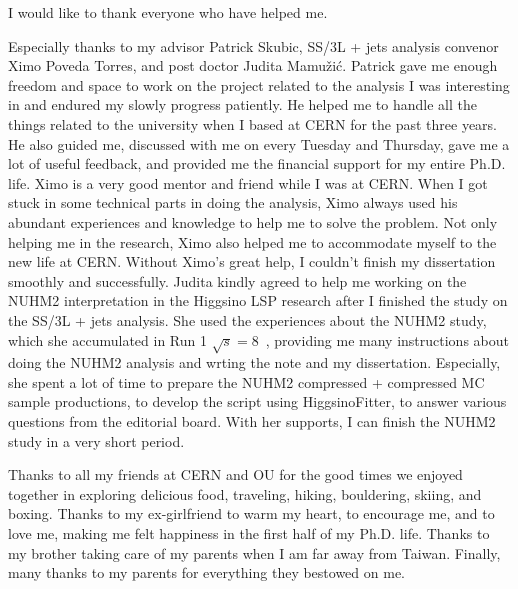 I would like to thank everyone who have helped me.

Especially thanks to my advisor Patrick Skubic, SS/3L + jets analysis convenor Ximo Poveda Torres, and post doctor Judita Mamu\v{z}i\'{c}.
%
Patrick gave me enough freedom and space to work on the project related to the analysis I was interesting in and endured my slowly progress patiently.
He helped me to handle all the things related to the university when I based at CERN for the past three years.
He also guided me, discussed with me on every Tuesday and Thursday, gave me a lot of useful feedback, and provided me the financial support for my entire Ph.D. life.
%
Ximo is a very good mentor and friend while I was at CERN.
When I got stuck in some technical parts in doing the analysis, Ximo always used his abundant experiences and knowledge to help me to solve the problem.
Not only helping me in the research, Ximo also helped me to accommodate myself to the new life at CERN.
Without Ximo's great help, I couldn't finish my dissertation smoothly and successfully.
%
Judita kindly agreed to help me working on the NUHM2 interpretation in the Higgsino LSP research after I finished the study on the SS/3L + jets analysis.
She used the experiences about the NUHM2 study, which she accumulated in Run 1 $\sqrt{s} = 8$~{\TeV}, providing me many instructions about doing the NUHM2 analysis and wrting the note and my dissertation.
Especially, she spent a lot of time to prepare the NUHM2 compressed + compressed MC sample productions, to develop the script using HiggsinoFitter, to answer various questions from the editorial board.
With her supports, I can finish the NUHM2 study in a very short period.
%

Thanks to all my friends at CERN and OU for the good times we enjoyed together in exploring delicious food, traveling, hiking, bouldering, skiing, and boxing.
Thanks to my ex-girlfriend to warm my heart, to encourage me, and to love me, making me felt happiness in the first half of my Ph.D. life.
Thanks to my brother taking care of my parents when I am far away from Taiwan.
Finally, many thanks to my parents for everything they bestowed on me.


